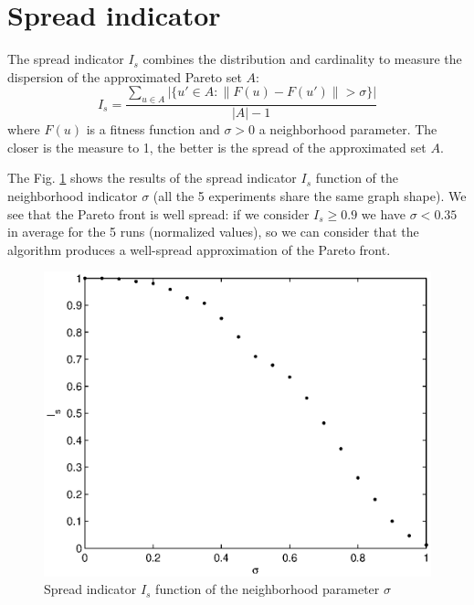 \section{Spread indicator}
\label{app:spread}

The spread indicator $I_s$ combines the distribution and cardinality to measure the dispersion of the approximated Pareto set $A$:
\begin{equation}
I_s = \frac{\sum_{u \in A}|\{u' \in A: \|F(u)-F(u')\|>\sigma\}|}{|A|-1}
\end{equation}
where $F(u)$ is a fitness function and $\sigma > 0$ a neighborhood parameter. The closer is the measure to 1, the better is the spread of the approximated set $A$.

The Fig. \ref{fig:spread_indicator} shows the results of the spread indicator $I_s$ function of the neighborhood indicator $\sigma$ (all the 5 experiments share the same graph shape). We see that the Pareto front is well spread: if  we consider $I_s \geq 0.9$ we have $\sigma < 0.35$ in average for the 5 runs (normalized values), so we can consider that the algorithm produces a well-spread approximation of the Pareto front.

\begin{figure}[h!]
\begin{center}
\includegraphics[width=1\linewidth]{spread_indicator_norm2.eps}
\end{center}
\vspace{-0.5cm}
\caption{Spread indicator $I_s$ function of the neighborhood parameter $\sigma$}
\label{fig:spread_indicator}
\end{figure}

